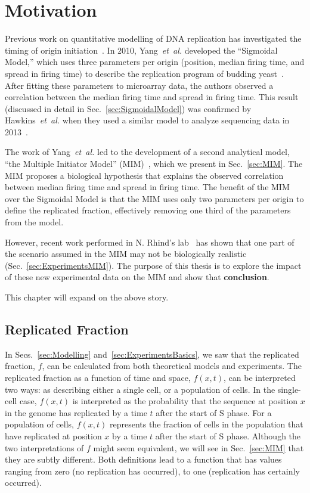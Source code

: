 \chapter{Motivation}
\label{ch:Motivation}

Previous work on quantitative modelling of DNA replication has investigated the timing of origin initiation~\cite{ScottsPaper,deMouraModel1,StochasticTermination,Goldar2009,OriginTimingReview}.
In 2010, Yang~\emph{et~al.} developed the ``Sigmoidal Model,'' which uses three parameters per origin (position, median firing time, and spread in firing time) to describe the replication program of budding yeast~\cite{ScottsPaper}.
After fitting these parameters to microarray data, the authors observed a correlation between the median firing time and spread in firing time.
This result (discussed in detail in Sec.~\ref{sec:SigmoidalModel}) was confirmed by Hawkins~\emph{et~al.} when they used a similar model to analyze sequencing data in 2013~\cite{StochasticTermination}.

The work of Yang~\emph{et~al.} led to the development of a second analytical model, ``the Multiple Initiator Model'' (MIM)~\cite{ScottsPaper}, which we present in Sec.~\ref{sec:MIM}.
The MIM proposes a biological hypothesis that explains the observed correlation between median firing time and spread in firing time.
The benefit of the MIM over the Sigmoidal Model is that the MIM uses only two parameters per origin to define the replicated fraction, effectively removing one third of the parameters from the model.

However, recent work performed in N. Rhind's lab~\cite{Rhind} has shown that one part of the scenario assumed in the MIM may not be biologically realistic (Sec.~\ref{sec:ExperimentsMIM}).
The purpose of this thesis is to explore the impact of these new experimental data on the MIM and show that \textbf{conclusion}.

This chapter will expand on the above story.


	\section{Replicated Fraction}
	\label{sec:ReplicatedFraction}
	
	In Secs.~\ref{sec:Modelling} and~\ref{sec:ExperimentsBasics}, we saw that the replicated fraction, $f$, can be calculated from both theoretical models and experiments.
	The replicated fraction as a function of time and space, $f(x,t)$, can be interpreted two ways:
	as describing either a single cell, or a population of cells.
	In the single-cell case, $f(x,t)$ is interpreted as the probability that the sequence at position $x$ in the genome has replicated by a time $t$ after the start of S phase.
	For a population of cells, $f(x,t)$ represents the fraction of cells in the population that have replicated at position $x$ by a time $t$ after the start of S phase.
	Although the two interpretations of $f$ might seem equivalent, we will see in Sec.~\ref{sec:MIM} that they are subtly different.
	Both definitions lead to a function that has values ranging from zero (no replication has occurred), to one (replication has certainly occurred).
	
